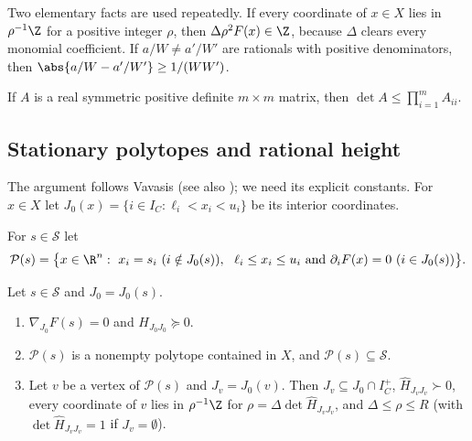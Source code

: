 Two elementary facts are used repeatedly. If every coordinate of $x\in X$
lies in $\rho^{-1}\Z$ for a positive integer $\rho$, then
$\Delta\rho^2F(x)\in\Z$, because $\Delta$ clears every monomial coefficient. If
$a/W\ne a'/W'$ are rationals with positive denominators, then
$\abs{a/W-a'/W'}\ge1/(WW')$.

\begin{lemma}\label{lem:hadamard}
If $A$ is a real symmetric positive definite $m\times m$ matrix, then
$\det A\le\prod_{i=1}^mA_{ii}$.
\end{lemma}

\subsection{Stationary polytopes and rational height}\label{sec:exact-height}

The argument follows Vavasis \cite{Vavasis1990} (see also
\cite{DelPiaDeyMolinaro2017}); we need its explicit constants. For $x\in X$ let
$J_0(x)=\{i\in I_C:\ell_i<x_i<u_i\}$ be its interior coordinates.

\begin{definition}\label{def:statpoly}
For $s\in\mathcal S$ let
\[
\mathcal P(s)=\bigl\{x\in\R^n:\ x_i=s_i\ (i\notin J_0(s)),\ \
\ell_i\le x_i\le u_i\ \text{and}\ \partial_iF(x)=0\ (i\in J_0(s))\bigr\}.
\]
\end{definition}

\begin{lemma}[Stationary polytopes]\label{lem:statpoly}
Let $s\in\mathcal S$ and $J_0=J_0(s)$.
\begin{enumerate}[label=(\alph*)]
\item $\nabla_{J_0}F(s)=0$ and $H_{J_0J_0}\succeq0$.
\item $\mathcal P(s)$ is a nonempty polytope contained in $X$, and
$\mathcal P(s)\subseteq\mathcal S$.
\item Let $v$ be a vertex of $\mathcal P(s)$ and $J_v=J_0(v)$. Then
$J_v\subseteq J_0\cap I_C^+$, $\hat H_{J_vJ_v}\succ0$, every coordinate of $v$ lies
in $\rho^{-1}\Z$ for $\rho=\Delta\det\hat H_{J_vJ_v}$, and $\Delta\le\rho\le R$
(with $\det\hat H_{J_vJ_v}=1$ if $J_v=\emptyset$).
\end{enumerate}
\end{lemma}

